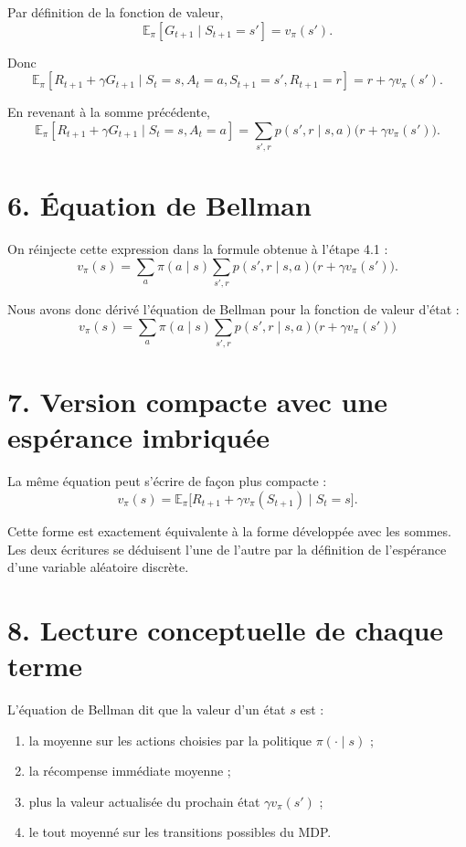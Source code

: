 \documentclass[11pt,a4paper]{article}
\begin{document}
Par définition de la fonction de valeur,
\[
\mathbb E_\pi[G_{t+1}\mid S_{t+1}=s'] = v_\pi(s').
\]

Donc
\[
\mathbb E_\pi[R_{t+1}+\gamma G_{t+1}\mid S_t=s,A_t=a,S_{t+1}=s',R_{t+1}=r]
= r + \gamma v_\pi(s').
\]

En revenant à la somme précédente,
\[
\mathbb E_\pi[R_{t+1}+\gamma G_{t+1}\mid S_t=s,A_t=a]
= \sum_{s',r} p(s',r\mid s,a)\big(r+\gamma v_\pi(s')\big).
\]

\section*{6. Équation de Bellman}

On réinjecte cette expression dans la formule obtenue à l'étape 4.1 :
\[
v_\pi(s)
=\sum_a \pi(a\mid s)
\sum_{s',r} p(s',r\mid s,a)\big(r+\gamma v_\pi(s')\big).
\]

Nous avons donc dérivé l'équation de Bellman pour la fonction de valeur d'état :
\[
\boxed{
v_\pi(s)
=\sum_a \pi(a\mid s)
\sum_{s',r} p(s',r\mid s,a)\big(r+\gamma v_\pi(s')\big)
}
\]

\section*{7. Version compacte avec une espérance imbriquée}

La même équation peut s'écrire de façon plus compacte :
\[
v_\pi(s)
=\mathbb E_\pi\big[R_{t+1}+\gamma v_\pi(S_{t+1})\mid S_t=s\big].
\]

Cette forme est exactement équivalente à la forme développée avec les sommes. Les deux écritures se déduisent l'une de l'autre par la définition de l'espérance d'une variable aléatoire discrète.

\section*{8. Lecture conceptuelle de chaque terme}

L'équation de Bellman dit que la valeur d'un état $s$ est :
\begin{enumerate}[leftmargin=2em]
    \item la moyenne sur les actions choisies par la politique $\pi(\cdot\mid s)$ ;
    \item la récompense immédiate moyenne ;
    \item plus la valeur actualisée du prochain état $\gamma v_\pi(s')$ ;
    \item le tout moyenné sur les transitions possibles du MDP.
\end{enumerate}
\end{document}
